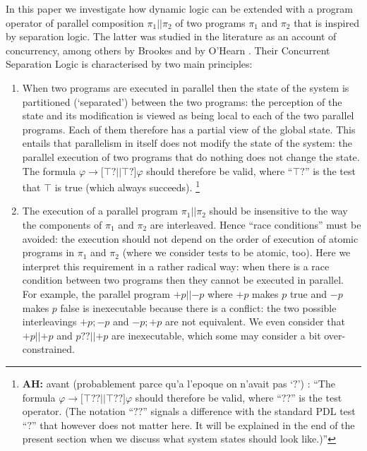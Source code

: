 \documentclass{llncs}
\newcommand{\pll}{ {||} }							%
\newcommand{\testendo}{?\!\!?}			%
\newcommand{\testpdl}{?}				%
\newcommand{\ah}[1]{\footnote{\textbf{AH:} #1}}
\newcommand{\assgntopV}[1]{{\mathtt {+} #1}}
\newcommand{\assgnbotV}[1]{{\mathtt {-} #1}}
\newcommand{\lbox}[1]{ \big[ #1 \big] }
\newcommand{\limp}{ \rightarrow }
\newcommand{\ndet}{\,{\cup}\,}
\renewcommand{\phi}{\varphi}
\begin{document}
In this paper we investigate how dynamic logic can be extended with 
a program operator of parallel composition $\pi_1 \pll \pi_2$ of two programs $\pi_1$ and $\pi_2$ 
that is inspired by separation logic. 
The latter was studied in the literature as an account of concurrency,
among others by Brookes and by O'Hearn %
\cite{OHearn04,Brookes04,Brookes07,BrookesO16}.
Their Concurrent Separation Logic is characterised by two main principles:
\begin{enumerate}
\item
When two programs are executed in parallel then 
the state of the system is partitioned (`separated') between the two programs: 
the perception of the state and its modification is viewed as 
being local to each of the two parallel programs. 
Each of them therefore has a partial view of the global state. 
This entails that parallelism in itself does not modify the state of the system:
the parallel execution of two programs that do nothing does not change the state. 
The formula 
$\phi \limp \lbox{ \top ? \pll \top ? } \phi$ 
should therefore be valid, where ``$ \top ? $'' is the test that $\top$ is true (which always succeeds).
\ah{
avant (probablement parce qu'a l'epoque on n'avait pas `$?$') :
``The formula 
$\phi \limp \lbox{ \top \testendo \pll \top \testendo } \phi$ 
should therefore be valid, where ``$ \testendo $'' is the test operator.
(The notation ``$ \testendo $'' signals a difference with the standard PDL test ``$ \testpdl $'' 
that however does not matter here.
It will be explained in the end of the present section
when we discuss what system states should look like.)''
}
\item
The execution of a parallel program $\pi_1 \pll \pi_2$ should be insensitive to 
the way the components of $\pi_1$ and $\pi_2$ are interleaved. 
Hence ``race conditions'' \cite{BrookesO16} must be avoided: 
the execution should not depend on the order of execution of atomic programs in $\pi_1$ and $\pi_2$ 
(where we consider tests to be atomic, too). 
Here we interpret this requirement in a rather radical way: 
when there is a race condition between two programs then they cannot be executed in parallel. 
For example, the parallel program $\assgntopV p \pll \assgnbotV p $
where $\assgntopV p$ makes $p$ true and $\assgnbotV p $ makes $p$ false 
is inexecutable because there is a conflict: 
the two possible interleavings 
$\assgntopV p ; \assgnbotV p $ and $\assgnbotV p  ; \assgntopV p $ are not equivalent. 
We even consider that $ \assgntopV p \pll \assgntopV p$ and $ p \testendo \pll \assgntopV p$ are inexecutable, 
which some may consider a bit over-constrained. 
\end{enumerate}
\end{document}
